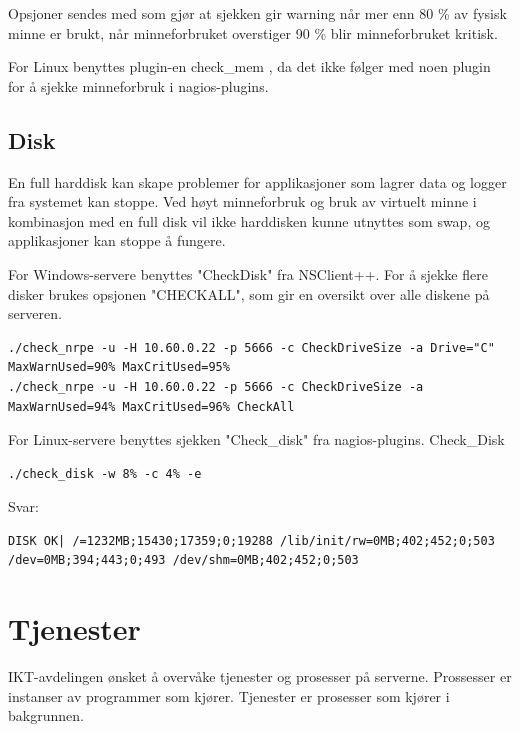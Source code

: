 Opsjoner sendes med som gjør at sjekken gir warning når mer enn 80 \% av fysisk minne er brukt, når minneforbruket overstiger 90 \% blir minneforbruket kritisk.

For Linux benyttes plugin-en check\_mem \cite{checklinuxmem}, da det ikke følger med noen plugin for å sjekke minneforbruk i nagios-plugins.

\subsection{Disk}
En full harddisk kan skape problemer for applikasjoner som lagrer data og logger fra systemet kan stoppe. Ved høyt minneforbruk og bruk av virtuelt minne i kombinasjon med en full disk vil ikke harddisken kunne utnyttes som swap, og applikasjoner kan stoppe å fungere.

For Windows-servere benyttes "CheckDisk" fra NSClient++. For å sjekke flere disker brukes opsjonen "CHECKALL", som gir en oversikt over alle diskene på serveren.

\begin{lstlisting}
./check_nrpe -u -H 10.60.0.22 -p 5666 -c CheckDriveSize -a Drive="C" MaxWarnUsed=90% MaxCritUsed=95%
./check_nrpe -u -H 10.60.0.22 -p 5666 -c CheckDriveSize -a MaxWarnUsed=94% MaxCritUsed=96% CheckAll
\end{lstlisting}

For Linux-servere benyttes sjekken "Check\_disk" fra nagios-plugins.
Check\_Disk
\begin{lstlisting}
./check_disk -w 8% -c 4% -e
\end{lstlisting}
Svar: 
\begin{lstlisting}
DISK OK| /=1232MB;15430;17359;0;19288 /lib/init/rw=0MB;402;452;0;503 /dev=0MB;394;443;0;493 /dev/shm=0MB;402;452;0;503
\end{lstlisting}

\section{Tjenester}
IKT-avdelingen ønsket å overvåke tjenester og prosesser på serverne. Prossesser er instanser av programmer som kjører. Tjenester er prosesser som kjører i bakgrunnen. 

